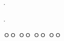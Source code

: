 
                   {
\begin{questionbox}{\thechapter. \QuestionNumberumber}

\end{questionbox}

\begin{solbox}{\thechapter. \QuestionNumberumber}
\bnset
{}


\bn \zzz

\bnset
{}
\bn \zzz

\bnset
{}
\bn \zzz

 ㅇㅇ \zzz
{} ㅇㅇ \zzz
{} ㅇㅇ \zzz
{} ㅇㅇ
\end{solbox}
\clearpage}
